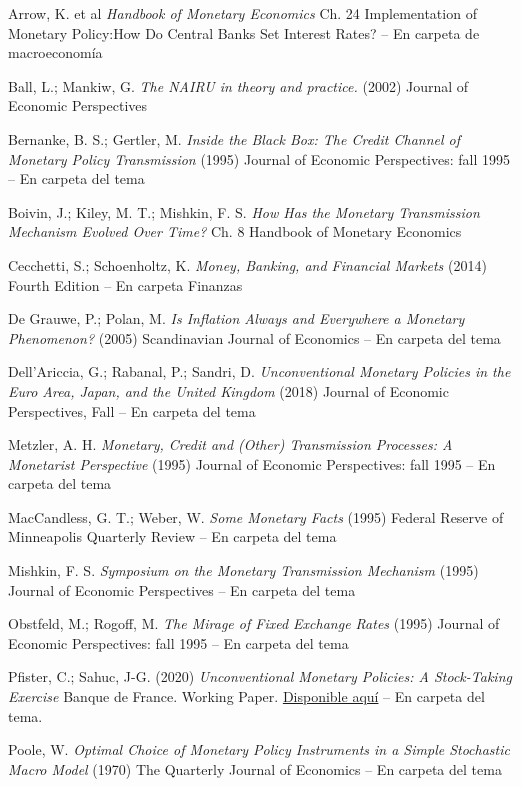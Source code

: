 \documentclass{nuevotema}
\begin{document}
Arrow, K. et al \textit{Handbook of Monetary Economics} Ch. 24 Implementation of Monetary Policy:How Do Central Banks Set Interest Rates? -- En carpeta de macroeconomía

Ball, L.; Mankiw, G.  \textit{The NAIRU in theory and practice.} (2002) Journal of Economic Perspectives

Bernanke, B. S.; Gertler, M. \textit{Inside the Black Box: The Credit Channel of Monetary Policy Transmission} (1995) Journal of Economic Perspectives: fall 1995 -- En carpeta del tema

Boivin, J.; Kiley, M. T.; Mishkin, F. S. \textit{How Has the Monetary Transmission Mechanism Evolved Over Time?} Ch. 8 Handbook of Monetary Economics

Cecchetti, S.; Schoenholtz, K. \textit{Money, Banking, and Financial Markets} (2014) Fourth Edition -- En carpeta Finanzas

De Grauwe, P.; Polan, M. \textit{Is Inflation Always and Everywhere a Monetary Phenomenon?} (2005) Scandinavian Journal of Economics -- En carpeta del tema

Dell'Ariccia, G.; Rabanal, P.; Sandri, D. \textit{Unconventional Monetary Policies in the Euro Area, Japan, and the United Kingdom} (2018) Journal of Economic Perspectives, Fall -- En carpeta del tema

Metzler, A. H. \textit{Monetary, Credit and (Other) Transmission Processes: A Monetarist Perspective} (1995) Journal of Economic Perspectives: fall 1995 -- En carpeta del tema

MacCandless, G. T.; Weber, W. \textit{Some Monetary Facts} (1995) Federal Reserve of Minneapolis Quarterly Review -- En carpeta del tema

Mishkin, F. S. \textit{Symposium on the Monetary Transmission Mechanism} (1995) Journal of Economic Perspectives -- En carpeta del tema

Obstfeld, M.; Rogoff, M. \textit{The Mirage of Fixed Exchange Rates} (1995) Journal of Economic Perspectives: fall 1995 -- En carpeta del tema

Pfister, C.; Sahuc, J-G. (2020) \textit{ Unconventional Monetary Policies: A Stock-Taking Exercise} Banque de France. Working Paper. \href{https://publications.banque-france.fr/sites/default/files/medias/documents/wp761.pdf}{Disponible aquí} -- En carpeta del tema.

Poole, W. \textit{Optimal Choice of Monetary Policy Instruments in a Simple Stochastic Macro Model} (1970) The Quarterly Journal of Economics -- En carpeta del tema
\end{document}
